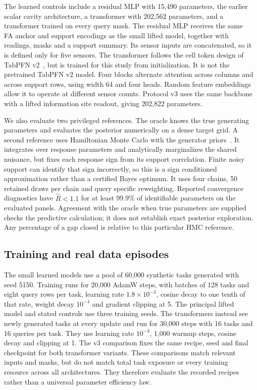 The learned controls include a residual MLP with 15,490 parameters, the earlier scalar cavity architecture, a transformer with 202,562 parameters, and a transformer trained on every query mask. The residual MLP receives the same FA anchor and support encodings as the small lifted model, together with readings, masks and a support summary. Its sensor inputs are concatenated, so it is defined only for five sensors. The transformer follows the cell token design of TabPFN v2~\citep{hollmann2025tabpfnv2}, but is trained for this study from initialization. It is not the pretrained TabPFN v2 model. Four blocks alternate attention across columns and across support rows, using width 64 and four heads. Random feature embeddings allow it to operate at different sensor counts. Protocol v3 uses the same backbone with a lifted information site readout, giving 202,822 parameters.

We also evaluate two privileged references. The oracle knows the true generating parameters and evaluates the posterior numerically on a dense target grid. A second reference uses Hamiltonian Monte Carlo with the generator priors~\citep{neal2011hmc}. It integrates over response parameters and analytically marginalizes the shared nuisance, but fixes each response sign from its support correlation. Finite noisy support can identify that sign incorrectly, so this is a sign conditioned approximation rather than a certified Bayes optimum. It uses four chains, 50 retained draws per chain and query specific reweighting. Reported convergence diagnostics have $\widehat{R}<1.1$ for at least 99.9\% of identifiable parameters on the evaluated panels. Agreement with the oracle when true parameters are supplied checks the predictive calculation; it does not establish exact posterior exploration. Any percentage of a gap closed is relative to this particular HMC reference.

\subsection{Training and real data episodes}

The small learned models use a pool of 60,000 synthetic tasks generated with seed 5150. Training runs for 20,000 AdamW steps, with batches of 128 tasks and eight query rows per task, learning rate $1.8\times10^{-3}$, cosine decay to one tenth of that rate, weight decay $10^{-4}$ and gradient clipping at 5. The principal lifted model and stated controls use three training seeds. The transformers instead see newly generated tasks at every update and run for 30,000 steps with 16 tasks and 16 queries per task. They use learning rate $10^{-3}$, 1,000 warmup steps, cosine decay and clipping at 1. The v3 comparison fixes the same recipe, seed and final checkpoint for both transformer variants. These comparisons match relevant inputs and masks, but do not match total task exposure or every training resource across all architectures. They therefore evaluate the recorded recipes rather than a universal parameter efficiency law.

